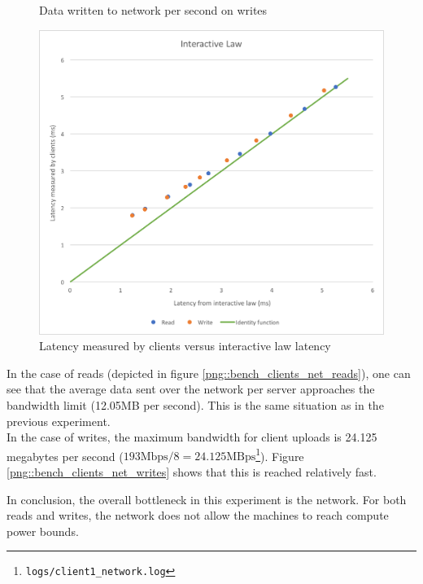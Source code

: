 \documentclass[11pt,a4paper]{article}
\begin{document}
\begin{figure}[!h]
\begin{minipage}[b]{.45\textwidth}
        \caption{Data written to network per second on writes}
        \label{png::bench_clients_net_writes}
    \end{minipage}
    \begin{minipage}[b]{.45\textwidth}
        \vspace{1cm}
        \centering
        \includegraphics[width=\textwidth]{processing/graphics/bench_clients_inter_law.png}
        \caption{Latency measured by clients versus interactive law latency}
        \label{png::bench_clients_inter_law}
    \end{minipage}
\end{figure}

In the case of reads (depicted in figure \ref{png::bench_clients_net_reads}), one can see that the average data sent over the network per server approaches the bandwidth limit (12.05MB per second). This is the same situation as in the previous experiment.\\
In the case of writes, the maximum bandwidth for client uploads is 24.125 megabytes per second ($193\text{Mbps}/8=24.125\text{MBps}$\footnote{\texttt{logs/client1_network.log}}). Figure \ref{png::bench_clients_net_writes} shows that this is reached relatively fast.

In conclusion, the overall bottleneck in this experiment is the network. For both reads and writes, the network does not allow the machines to reach compute power bounds.
\end{document}

